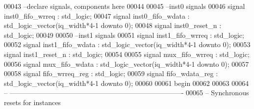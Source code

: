 \begin{DoxyCode}
00043 \textcolor{keyword}{--declare signals,  components here}
00044 
00045 \textcolor{keyword}{--inst0 signals}
00046 \textcolor{keywordflow}{signal} \textcolor{vhdlchar}{inst0_fifo_wrreq} \textcolor{vhdlchar}{:} \textcolor{comment}{std\_logic};
00047 \textcolor{keywordflow}{signal} \textcolor{vhdlchar}{inst0_fifo_wdata} \textcolor{vhdlchar}{:} \textcolor{comment}{std\_logic\_vector}\textcolor{vhdlchar}{(}\textcolor{vhdlchar}{iq_width}\textcolor{vhdlchar}{*}\textcolor{vhdllogic}{4-1} \textcolor{keywordflow}{downto} \textcolor{vhdllogic}{}\textcolor{vhdllogic}{0}\textcolor{vhdlchar}{)};
00048 \textcolor{keywordflow}{signal} \textcolor{vhdlchar}{inst0_reset_n}        \textcolor{vhdlchar}{:} \textcolor{comment}{std\_logic};
00049 
00050 \textcolor{keyword}{--inst1 signals}
00051 \textcolor{keywordflow}{signal} \textcolor{vhdlchar}{inst1_fifo_wrreq} \textcolor{vhdlchar}{:} \textcolor{comment}{std\_logic};
00052 \textcolor{keywordflow}{signal} \textcolor{vhdlchar}{inst1_fifo_wdata} \textcolor{vhdlchar}{:} \textcolor{comment}{std\_logic\_vector}\textcolor{vhdlchar}{(}\textcolor{vhdlchar}{iq_width}\textcolor{vhdlchar}{*}\textcolor{vhdllogic}{4-1} \textcolor{keywordflow}{downto} \textcolor{vhdllogic}{}\textcolor{vhdllogic}{0}\textcolor{vhdlchar}{)};
00053 \textcolor{keywordflow}{signal} \textcolor{vhdlchar}{inst1_reset_n}        \textcolor{vhdlchar}{:} \textcolor{comment}{std\_logic};
00054 
00055 \textcolor{keywordflow}{signal} \textcolor{vhdlchar}{mux_fifo_wrreq}   \textcolor{vhdlchar}{:} \textcolor{comment}{std\_logic};
00056 \textcolor{keywordflow}{signal} \textcolor{vhdlchar}{mux_fifo_wdata}   \textcolor{vhdlchar}{:} \textcolor{comment}{std\_logic\_vector}\textcolor{vhdlchar}{(}\textcolor{vhdlchar}{iq_width}\textcolor{vhdlchar}{*}\textcolor{vhdllogic}{4-1} \textcolor{keywordflow}{downto} \textcolor{vhdllogic}{}\textcolor{vhdllogic}{0}\textcolor{vhdlchar}{)};
00057 
00058 \textcolor{keywordflow}{signal} \textcolor{vhdlchar}{fifo_wrreq_reg}   \textcolor{vhdlchar}{:} \textcolor{comment}{std\_logic};
00059 \textcolor{keywordflow}{signal} \textcolor{vhdlchar}{fifo_wdata_reg}   \textcolor{vhdlchar}{:} \textcolor{comment}{std\_logic\_vector}\textcolor{vhdlchar}{(}\textcolor{vhdlchar}{iq_width}\textcolor{vhdlchar}{*}\textcolor{vhdllogic}{4-1} \textcolor{keywordflow}{downto} \textcolor{vhdllogic}{}\textcolor{vhdllogic}{0}\textcolor{vhdlchar}{)};
00060   
00061 \textcolor{vhdlkeyword}{begin}
00062  
00063  
00064 \textcolor{keyword}{ -- ----------------------------------------------------------------------------}
00065 \textcolor{keyword}{-- Synchronous resets for instances}

\end{DoxyCode}

